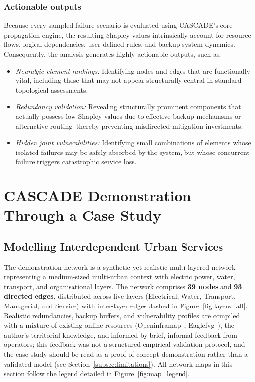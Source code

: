 \documentclass[review,12pt]{elsarticle}
\begin{document}
\subsubsection{Actionable outputs}
\label{subsubsec:shapleyoutputs}
Because every sampled failure scenario is evaluated using CASCADE's core propagation engine, the resulting Shapley values intrinsically account for resource flows, logical dependencies, user-defined rules, and backup system dynamics. Consequently, the analysis generates highly actionable outputs, such as:
\begin{itemize}
  \item \emph{Neuralgic element rankings:} Identifying nodes and edges that are functionally vital, including those that may not appear structurally central in standard topological assessments.
  \item \emph{Redundancy validation:} Revealing structurally prominent
    components that actually possess low Shapley values due to effective backup mechanisms or alternative routing, thereby preventing misdirected mitigation investments.
  \item \emph{Hidden joint vulnerabilities:} Identifying small combinations of elements whose isolated failures may be safely absorbed by the system, but whose concurrent failure triggers catastrophic service loss.
\end{itemize}




\section{CASCADE Demonstration Through a Case Study}
\label{sec:case}



\subsection{Modelling Interdependent Urban Services}
\label{subsec:case_modelling}

The demonstration network is a synthetic yet realistic multi-layered network representing a medium-sized multi-urban context with electric power, water, transport, and organisational layers.
The network comprises \textbf{39 nodes} and \textbf{93 directed edges}, distributed across five layers (Electrical, Water, Transport, Managerial, and Service) with inter-layer edges dashed in Figure~\ref{fig:layers_all}. Realistic redundancies, backup buffers, and vulnerability profiles are compiled with a mixture of existing online resources (Openinframap~\cite{openinframap}, Eaglefvg~\cite{eaglefvg}), the author's territorial knowledge, and informed by brief, informal feedback from operators; this feedback was not a structured empirical validation protocol, and the case study should be read as a proof-of-concept demonstration rather than a validated model (see Section~\ref{subsec:limitations}). All network maps in this section follow the legend detailed in Figure~\ref{fig:map_legend}.
\end{document}
